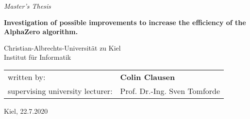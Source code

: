 \documentclass[12pt,onecolumn,oneside,titlepage]{article}
\begin{document}

\begin{center}
{\huge \it Master's Thesis}

\thispagestyle{empty}

\vspace{2cm}

{\Large \bf Investigation of possible improvements to increase the efficiency of the AlphaZero algorithm.}

\vspace{2.25cm}

\vspace{2.25cm}

{\large 
Christian-Albrechts-Universität zu Kiel \\
Institut für Informatik  \\
}

\end{center}

\vspace{2cm}

\begin{tabular}{ll}
written by:             & {\bf Colin Clausen} \\
supervising university lecturer: & Prof. Dr.-Ing. Sven Tomforde \\%
\end{tabular}

\vspace{1cm}

\begin{center}
Kiel, 22.7.2020
\end{center}


\pagebreak

\newpage\null\thispagestyle{empty}\newpage



\vspace{1.5cm}
\end{document}
